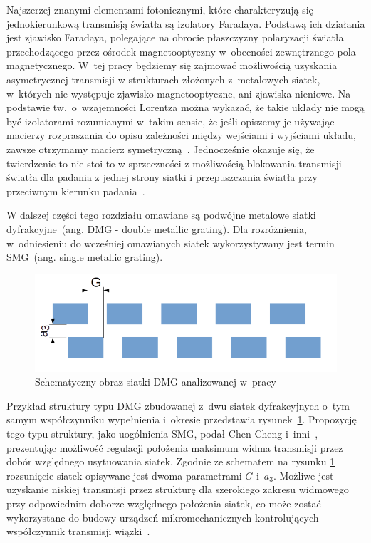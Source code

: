 Najszerzej znanymi elementami fotonicznymi, które charakteryzują się jednokierunkową transmisją światła są izolatory Faradaya.  Podstawą ich działania jest zjawisko Faradaya, polegające na obrocie płaszczyzny polaryzacji światła przechodzącego przez ośrodek magnetooptyczny w~obecności zewnętrznego pola magnetycznego. W~tej pracy będziemy się zajmować możliwością uzyskania asymetrycznej transmisji w strukturach złożonych z~metalowych siatek, w~których nie występuje zjawisko magnetooptyczne, ani zjawiska nieniowe. Na podstawie tw.~o~wzajemności Lorentza można wykazać, że takie układy nie mogą być izolatorami rozumianymi w~takim sensie, że jeśli opiszemy je używając macierzy rozpraszania do opisu zależności między wejściami i wyjściami układu, zawsze otrzymamy macierz symetryczną~\cite{jalas2013and}. Jednocześnie okazuje się, że twierdzenie to nie stoi to w sprzeczności z możliwością blokowania transmisji światła dla padania z jednej strony siatki i przepuszczania światła przy przeciwnym kierunku padania~\cite{lockyear2006one}.

W dalszej części tego rozdziału omawiane są podwójne metalowe siatki dyfrakcyjne~(ang. DMG - double metallic grating). Dla rozróżnienia, w~odniesieniu do wcześniej omawianych siatek wykorzystywany jest termin SMG~(ang. single metallic grating).

\begin{figure}[tb]
	\includegraphics[width=\textwidth]{images/dmg/dmg_general_schem.png}
	\caption{Schematyczny obraz siatki DMG analizowanej w~pracy~\cite{cheng2007controllable}}
	\label{fig:cheng_dmg_schem}
\end{figure}

Przykład struktury typu DMG zbudowanej z~dwu siatek dyfrakcyjnych o~tym samym współczynniku wypełnienia i~okresie przedstawia rysunek~\ref{fig:cheng_dmg_schem}. Propozycję tego typu struktury, jako uogólnienia SMG, podał Chen Cheng i~inni~\cite{cheng2007controllable}, prezentując możliwość regulacji położenia maksimum widma transmisji przez dobór względnego usytuowania siatek. Zgodnie ze schematem na rysunku \ref{fig:cheng_dmg_schem} rozsunięcie siatek opisywane jest dwoma parametrami $G$ i~$a_3$. Możliwe jest uzyskanie niskiej transmisji przez strukturę dla szerokiego zakresu widmowego przy odpowiednim doborze względnego położenia siatek, co może zostać wykorzystane do budowy urządzeń mikromechanicznych kontrolujących współczynnik transmisji wiązki~\cite{cheng2007controllable}.

